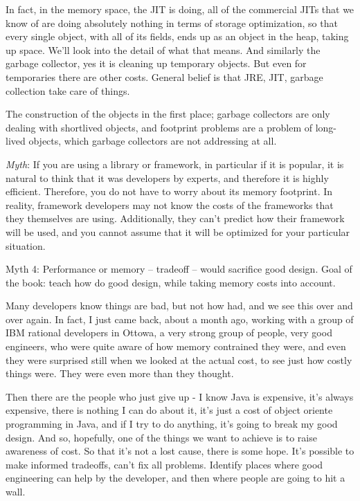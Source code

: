 In fact, in the memory space, the JIT is doing, all of the commercial JITs that we know of are doing absolutely nothing 
in terms of storage optimization, so that every single object, with all of its fields, ends up as an object in the heap, 
taking up space.  We'll look into the detail of what that means. And similarly the garbage collector, yes it is cleaning up 
temporary objects. But even for temporaries there are other costs.
General belief is that JRE, JIT, garbage collection take care of things.

The construction of the objects in the first place; garbage collectors are only dealing with shortlived objects,
 and footprint problems are a problem of long-lived objects, which garbage collectors are not addressing at all.
 

\emph{Myth}: If you are using a library or framework, in particular if
it is popular, it is natural to think that it was developers by experts, and
therefore it is highly efficient. Therefore, you do not have to worry about
its memory footprint. In reality, framework developers may not know
the costs of the frameworks that they themselves are using.  Additionally, they
can't predict how their framework will be used, and you cannot assume that it
will be optimized for your particular situation.


Myth 4: Performance or memory -- tradeoff -- would sacrifice good design.
Goal of the book:  teach how do good design, while taking memory costs into account.

Many developers know things are bad, but not how had, and we see this over and over again. 
In fact, I just came back, about a month ago, working with a group of IBM rational developers in Ottowa, 
a very strong group of people, very good engineers, who were quite aware of how memory contrained they were,
 and even they were surprised still when we looked at the actual cost, to see just how costly things were. 
 They were even more than they thought.

Then there are the people who just give up - I know Java is expensive, it's always expensive, 
there is nothing I can do about it, it's just a cost of object oriente programming in Java, and if I try to do anything, 
it's going to break my good design.
And so, hopefully, one of the things we want to achieve is to raise awareness of cost. 
So that it's not a lost cause, there is some hope.  It's possible to make informed tradeoffs, can't fix all problems. 
Identify places where good engineering can help by the developer, and then where people are going to hit a wall.

